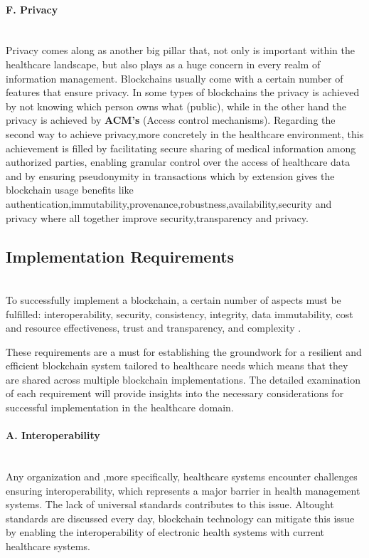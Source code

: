 \paragraph{F. Privacy} \mbox{}\\
Privacy comes along as another big pillar that, not only is important within the healthcare landscape, but also plays as a huge concern in every realm of information management. Blockchains usually come with a certain number of features that ensure privacy. In some types of blockchains the privacy is achieved by not knowing which person owns what (public), while in the other hand the privacy is achieved by \textbf{ACM's} (Access control mechanisms). Regarding the second way to achieve privacy,more concretely in the healthcare environment, this achievement is filled by facilitating secure sharing of medical information among authorized parties, enabling granular control over the access of healthcare data and by ensuring pseudonymity in transactions which by extension gives the blockchain usage benefits like authentication,immutability,provenance,robustness,availability,security and privacy where all together improve security,transparency and privacy.

\subsection{Implementation Requirements} \mbox{}\\
To successfully implement a blockchain, a certain number of aspects must be fulfilled: interoperability, security, consistency, integrity, data immutability, cost and resource effectiveness, trust and transparency, and complexity \cite{blockchain-utilization-in-healthcare}.

These requirements are a must for establishing the groundwork for a resilient and efficient blockchain system tailored to healthcare needs which means that they are shared across multiple blockchain implementations. The detailed examination of each requirement will provide insights into the necessary considerations for successful implementation in the healthcare domain.

\paragraph{A. Interoperability} \mbox{}\\
Any organization and ,more specifically, healthcare systems encounter challenges ensuring interoperability, which represents a major barrier in health management systems. The lack of universal standards contributes to this issue. Altought standards are discussed every day,   blockchain technology can mitigate this issue by enabling the interoperability of electronic health systems with current healthcare systems.

